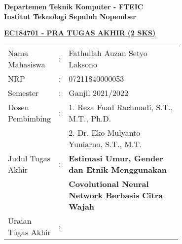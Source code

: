 \begin{flushleft}
    \textbf{Departemen Teknik Komputer - FTEIC}\\
    \textbf{Institut Teknologi Sepuluh Nopember}\\
  \end{flushleft}
  
  \begin{center}
    \underline{\textbf{EC184701 - PRA TUGAS AKHIR (2 SKS)}}
  \end{center}
  
  \begin{adjustwidth}{-0.2cm}{}
    \begin{tabular}{lcp{0.7\linewidth}}
  
      Nama Mahasiswa &:& Fathullah Auzan Setyo Laksono \\
      NRP &:& 07211840000053 \\
  
      Semester &:& Ganjil 2021/2022 \\
  
      Dosen Pembimbing &:& 1. Reza Fuad Rachmadi, S.T., M.T., Ph.D. \\
      & & 2. Dr. Eko Mulyanto Yuniarno, S.T., M.T. \\
  
      Judul Tugas Akhir &:& \textbf{Estimasi Umur, Gender dan Etnik Menggunakan} \\
      & & \textbf{Covolutional Neural Network Berbasis Citra Wajah} \\
  
      Uraian Tugas Akhir &:& \\
    \end{tabular}
  \end{adjustwidth}
  
